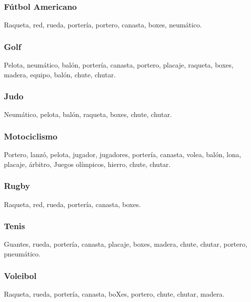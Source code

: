 \documentclass[../all.tex]{subfiles}
\begin{document}
    \subsubsection{Fútbol Americano}
    Raqueta, red, rueda, portería, portero, canasta, boxes, neumático.
    \subsubsection{Golf}
    Pelota, neumático, balón, portería, canasta, portero, placaje, raqueta, boxes, madera, equipo, balón, chute, chutar.
    \subsubsection{Judo}
    Neumático, pelota, balón, raqueta, boxes, chute, chutar.
    \subsubsection{Motociclismo}
    Portero, lanzó, pelota, jugador, jugadores, portería, canasta, volea, balón, lona, placaje, árbitro, Juegos olímpicos, hierro, chute, chutar.
    \subsubsection{Rugby}
    Raqueta, red, rueda, portería, canasta, boxes.
    \subsubsection{Tenis}
    Guantes, rueda, portería, canasta, placaje, boxes, madera, chute, chutar, portero, pneumático.
    \subsubsection{Voleibol}
    Raqueta, rueda, portería, canasta, boXes, portero, chute, chutar, madera.
\newpage
\end{document}
